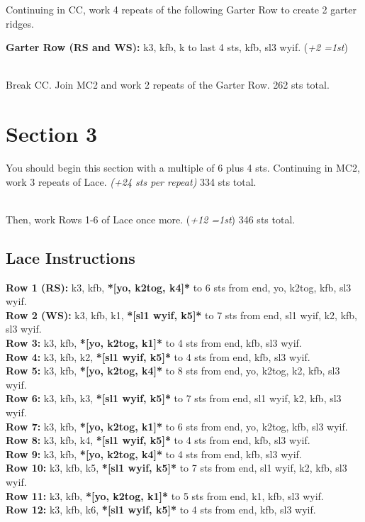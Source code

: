\documentclass[12pt]{article}
\newcommand{\rowDir}[1]{\textbf{#1:}} %
\renewcommand{\repeat}[1]{\textbf{*[#1]*}} %
\newcommand{\increase}[1]{(\emph{+#1 
	\ifnum#1=1{st}\else{sts}\fi})}
\begin{document}
Continuing in CC, work 4 repeats of the following Garter Row to create 2 garter ridges. 

\rowDir{Garter Row (RS and WS)} k3, kfb, k to last 4 sts, kfb, sl3 wyif. \increase{2}

~\\
Break CC. Join MC2 and work 2 repeats of the Garter Row. 262 sts total. 

\newpage
\section*{Section 3} %

You should begin this section with a multiple of 6 plus 4 sts. Continuing in MC2, work 3 repeats of Lace. \emph{(+24 sts per repeat)} 334 sts total.

~\\
Then, work Rows 1-6 of Lace once more. \increase{12} 346 sts total.


\subsection*{Lace Instructions} %

\rowDir{Row 1 (RS)} k3, kfb, \repeat{yo, k2tog, k4} to 6 sts from end, yo, k2tog, kfb, sl3 wyif. \\
\rowDir{Row 2 (WS)} k3, kfb, k1, \repeat{sl1 wyif, k5} to 7 sts from end, sl1 wyif, k2, kfb, sl3 wyif. \\
\rowDir{Row 3} k3, kfb, \repeat{yo, k2tog, k1} to 4 sts from end, kfb, sl3 wyif. \\
\rowDir{Row 4} k3, kfb, k2, \repeat{sl1 wyif, k5} to 4 sts from end, kfb, sl3 wyif. \\
\rowDir{Row 5} k3, kfb, \repeat{yo, k2tog, k4} to 8 sts from end, yo, k2tog, k2, kfb, sl3 wyif. \\
\rowDir{Row 6} k3, kfb, k3, \repeat{sl1 wyif, k5} to 7 sts from end, sl1 wyif, k2, kfb, sl3 wyif. \\
\rowDir{Row 7} k3, kfb, \repeat{yo, k2tog, k1} to 6 sts from end, yo, k2tog, kfb, sl3 wyif. \\
\rowDir{Row 8} k3, kfb, k4, \repeat{sl1 wyif, k5} to 4 sts from end, kfb, sl3 wyif. \\
\rowDir{Row 9} k3, kfb, \repeat{yo, k2tog, k4} to 4 sts from end, kfb, sl3 wyif. \\
\rowDir{Row 10} k3, kfb, k5, \repeat{sl1 wyif, k5} to 7 sts from end, sl1 wyif, k2, kfb, sl3 wyif. \\
\rowDir{Row 11} k3, kfb, \repeat{yo, k2tog, k1} to 5 sts from end, k1, kfb, sl3 wyif. \\
\rowDir{Row 12} k3, kfb, k6, \repeat{sl1 wyif, k5} to 4 sts from end, kfb, sl3 wyif.
\end{document}

